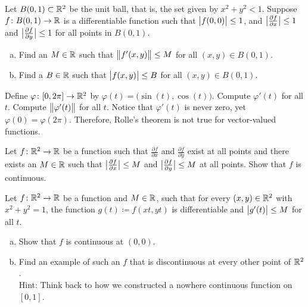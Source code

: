 \begin{exercise}
Let $B(0,1) \subset {\mathbb{R}}^2$ be the unit ball, that is, the set given by
$x^2 + y^2 < 1$.
Suppose $f \colon B(0,1) \to {\mathbb{R}}$ is a differentiable function
such that $\bigl\lvert {f(0,0)} \bigr\rvert \leq 1$,
and 
$\bigl\lvert {\frac{\partial f}{\partial x}} \bigr\rvert \leq 1$ and
$\bigl\lvert {\frac{\partial f}{\partial y}} \bigr\rvert \leq 1$ for all
points in $B(0,1)$.
\begin{enumerate}[a)]
\item
Find an $M \in {\mathbb{R}}$ such that $\bigl\lVert {f'(x,y)} \bigr\rVert \leq M$
for all $(x,y) \in
B(0,1)$.
\item
Find a $B \in {\mathbb{R}}$ such that
$\bigl\lvert {f(x,y)} \bigr\rvert \leq B$
for all $(x,y) \in
B(0,1)$.
\end{enumerate}
\end{exercise}

\begin{exercise}
Define $\varphi \colon [0,2\pi] \to {\mathbb{R}}^2$ by $\varphi(t) =
\bigl(\sin(t),\cos(t)\bigr)$.  Compute $\varphi'(t)$ for all $t$.  Compute
$\bigl\lVert {\varphi'(t)} \bigr\rVert$ for all $t$.  Notice that $\varphi'(t)$ is never zero,
yet $\varphi(0) = \varphi(2\pi)$.  Therefore, Rolle's theorem is not true
for vector-valued functions.
\end{exercise}

\begin{exercise}
Let $f \colon {\mathbb{R}}^2 \to {\mathbb{R}}$ be a function such that
$\frac{\partial f}{\partial x}$ and
$\frac{\partial f}{\partial y}$ exist at all points and there exists an $M
\in {\mathbb{R}}$
such that 
$\bigl\lvert {\frac{\partial f}{\partial x}} \bigr\rvert \leq M$ and
$\bigl\lvert {\frac{\partial f}{\partial y}} \bigr\rvert \leq M$ at all points.  Show that $f$
is continuous.
\end{exercise}

\begin{samepage}
\begin{exercise}
Let $f \colon {\mathbb{R}}^2 \to {\mathbb{R}}$ be a function and
$M \in {\mathbb{R}}$, such that
for every $(x,y) \in {\mathbb{R}}^2$ with $x^2+y^2=1$, the function $g(t) \coloneqq f(xt,yt)$ is
differentiable
and $\bigl\lvert {g'(t)} \bigr\rvert \leq M$ for all $t$.
\begin{enumerate}[a)]
\item
Show that $f$ is continuous at $(0,0)$.
\item
Find an example of such an $f$ that is discontinuous at every other point of
${\mathbb{R}}^2$.\\
Hint: Think back to how we constructed a nowhere continuous function on $[0,1]$.
\end{enumerate}
\end{exercise}
\end{samepage}

